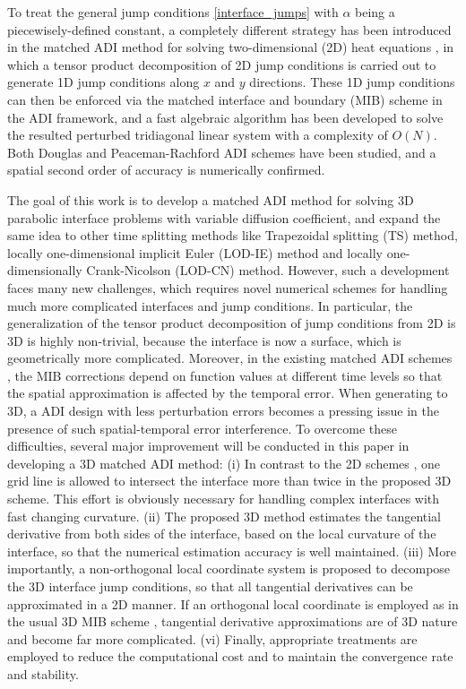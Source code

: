 \documentclass[dissertation]{uathesis}
\begin{document}
\begin{body}
To treat the general jump conditions \eqref{interface_jumps} with $\alpha$ being a piecewisely-defined constant, a completely different strategy has been introduced in the matched ADI method for solving  two-dimensional (2D) heat equations \cite{zhao2015matched,li2017matched}, in which a tensor product decomposition of 2D jump conditions is carried out to generate 1D jump conditions along $x$ and $y$ directions. These 1D jump conditions can then be enforced via the matched interface and boundary (MIB) scheme \cite{zhao2004high, zhou2006high,yu2007three,yu2007matched} in the ADI framework, 
and a fast algebraic algorithm has been developed to solve the resulted perturbed tridiagonal linear system with a complexity of $O(N)$. Both Douglas  \cite{zhao2015matched} and Peaceman-Rachford \cite{li2017matched} ADI schemes have been studied, and a spatial second order of accuracy is numerically confirmed. 

The goal of this work is to develop a matched ADI method for solving 3D parabolic interface problems with variable diffusion coefficient, and expand the same idea to other time splitting methods like Trapezoidal splitting (TS) method, locally one-dimensional implicit Euler (LOD-IE) method and locally one-dimensionally Crank-Nicolson (LOD-CN) method. However, such a development faces many new challenges, which requires novel numerical schemes for handling much more complicated interfaces and jump conditions. In particular, the generalization of the tensor product decomposition of jump conditions from 2D is 3D is highly non-trivial, because the interface is now a surface, which is geometrically more complicated. Moreover, in the existing matched ADI schemes \cite{zhao2015matched,li2017matched}, the MIB corrections depend on function values at different time levels so that the spatial approximation is affected by the temporal error. When generating to 3D, a ADI design with less perturbation errors becomes a pressing issue in the presence of such spatial-temporal error interference. 
To overcome these difficulties, several major improvement will be conducted in this paper in developing a 3D matched ADI method: 
(i) In contrast to the 2D schemes  \cite{zhao2015matched,li2017matched}, one grid line is allowed to intersect the interface more than twice in the proposed 3D scheme. This effort is obviously necessary for handling complex interfaces with fast changing curvature. (ii) The proposed 3D method estimates the tangential derivative from both sides of the interface, based on the local curvature of the interface, so that the numerical estimation accuracy is well maintained. 
(iii) More importantly, a non-orthogonal local coordinate system is proposed to decompose the 3D interface jump conditions, so that all tangential derivatives can be approximated in a 2D manner. If an orthogonal local coordinate is employed as in the usual  3D  MIB scheme \cite{yu2007three}, tangential derivative approximations are of 3D nature and become far more complicated. (vi) Finally, appropriate treatments are employed to reduce the computational cost and to maintain the convergence rate and stability.


\end{body}
\end{document}
